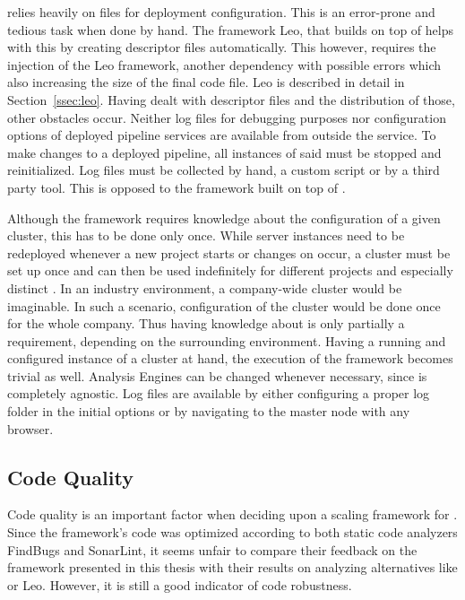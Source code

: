 \uimaas{} relies heavily on \xml{} files for deployment configuration. This is an error-prone and tedious task when done by hand. The framework Leo, that builds on top of \uimaas{} helps with this by creating \xml{} descriptor files automatically. This however, requires the injection of the Leo framework, another dependency with possible errors which also increasing the size of the final code file. Leo is described in detail in Section~\ref{ssec:leo}. Having dealt with \xml{} descriptor files and the distribution of those, other obstacles occur. Neither log files for debugging purposes nor configuration options of deployed pipeline services are available from outside the service. To make changes to a deployed pipeline, all instances of said \anen{} must be stopped and reinitialized. Log files must be collected by hand, a custom script or by a third party tool. This is opposed to the framework built on top of \spark{}.

Although the framework requires knowledge about the configuration of a given \spark{} cluster, this has to be done only once. While \uimaas{} server instances need to be redeployed whenever a new project starts or changes on \anens{} occur, a \spark{} cluster must be set up once and can then be used indefinitely for different projects and especially distinct \anens{}. In an industry environment, a company-wide \spark{} cluster would be imaginable. In such a scenario, configuration of the \spark{} cluster would be done once for the whole company. Thus having knowledge about \spark{} is only partially a requirement, depending on the surrounding environment. Having a running and configured instance of a \spark{} cluster at hand, the execution of the framework becomes trivial as well. Analysis Engines can be changed whenever necessary, since \spark{} is completely \uima{} agnostic. Log files are available by either configuring a proper log folder in the initial \spark{} options or by navigating to the \spark{} master node with any browser.
\subsection{Code Quality}
Code quality is an important factor when deciding upon a scaling framework for \uima{}. Since the framework's code was optimized according to both static code analyzers FindBugs and SonarLint, it seems unfair to compare their feedback on the framework presented in this thesis with their results on analyzing alternatives like \uimaas{} or Leo. However, it is still a good indicator of code robustness.

